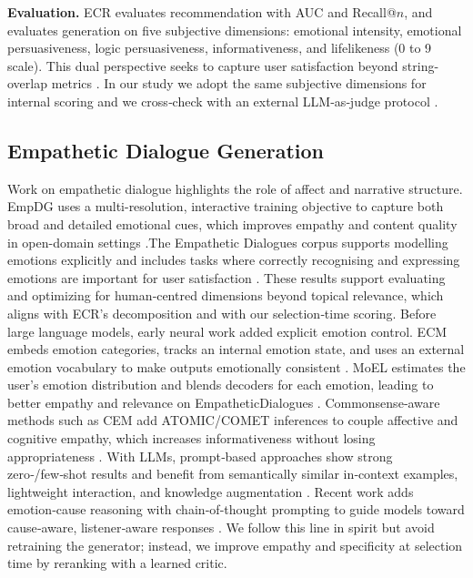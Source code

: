 \documentclass[12pt]{article}
\begin{document}
  \textbf{Evaluation.} ECR evaluates recommendation with AUC and Recall@\(n\), and evaluates generation on five subjective dimensions: emotional intensity, emotional persuasiveness, logic persuasiveness, informativeness, and lifelikeness (0 to 9 scale). This dual perspective seeks to capture user satisfaction beyond string-overlap metrics \citep{zhang2024ecr}. In our study we adopt the same subjective dimensions for internal scoring and we cross‑check with an external LLM‑as‑judge protocol \citep{yan2023llmjudge}.

  \subsection{Empathetic Dialogue Generation}
  Work on empathetic dialogue highlights the role of affect and narrative structure. EmpDG uses a multi-resolution, interactive training objective to capture both broad and detailed emotional cues, which improves empathy and content quality in open-domain settings \citep{li2020empdg}.The Empathetic Dialogues corpus supports modelling emotions explicitly and includes tasks where correctly recognising and expressing emotions are important for user satisfaction \citep{rashkin2019empathetic}. These results support evaluating and optimizing for human‑centred dimensions beyond topical relevance, which aligns with ECR's decomposition and with our selection‑time scoring.
  \newline
  \newline
  Before large language models, early neural work added explicit emotion control. ECM embeds emotion categories, tracks an internal emotion state, and uses an external emotion vocabulary to make outputs emotionally consistent \citep{zhou2018ecm}. MoEL estimates the user’s emotion distribution and blends decoders for each emotion, leading to better empathy and relevance on EmpatheticDialogues \citep{lin2019moel,rashkin2019empathetic}. Commonsense‑aware methods such as CEM add ATOMIC/COMET inferences to couple affective and cognitive empathy, which increases informativeness without losing appropriateness \citep{sabour2022cem}. With LLMs, prompt‑based approaches show strong zero‑/few‑shot results and benefit from semantically similar in‑context examples, lightweight interaction, and knowledge augmentation \citep{qian2023empatheticllm}. Recent work adds emotion‑cause reasoning with chain‑of‑thought prompting to guide models toward cause‑aware, listener‑aware responses \citep{chen2024causecot}. We follow this line in spirit but avoid retraining the generator; instead, we improve empathy and specificity at selection time by reranking with a learned critic.
  
\end{document}
